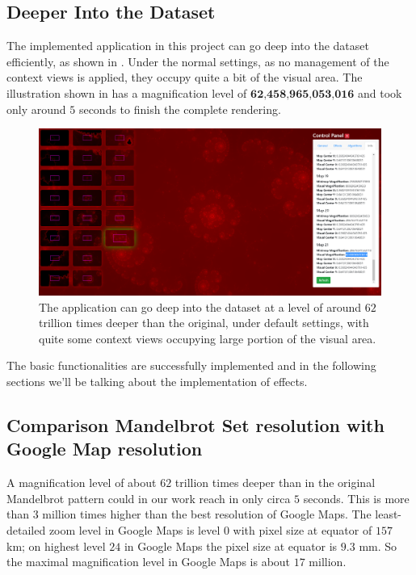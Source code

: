 \subsection{Deeper Into the Dataset}

The implemented application in this project can go deep into the dataset efficiently, as shown in . Under the normal settings, as no management of the context views is applied, they occupy quite a bit of the visual area. The illustration shown in  has a magnification level of $\textbf{62,458,965,053,016}$ and took only around $5$ seconds to finish the complete rendering.

\begin{figure}[H]
\centering
\includegraphics[width=\textwidth,keepaspectratio]{Figures/Chapter5/deep.png}
\decoRule
\caption[Zooming Deep Into the Dataset]{The application can go deep into the dataset at a level of around $62$ trillion times deeper than the original, under default settings, with quite some context views occupying large portion of the visual area.}
\label{fig:chap5:deep}
\end{figure}

The basic functionalities are successfully implemented and in the following sections we'll be talking about the implementation of effects.

\subsection{Comparison Mandelbrot Set resolution with Google Map resolution}

A magnification level of about $62$ trillion times deeper than in the original Mandelbrot pattern could in our work reach in only circa $5$ seconds. This is more than $3$ million times higher than the best resolution of Google Maps. The least-detailed zoom level in Google Maps is level $0$ with pixel size at equator of $157$ km; on highest level $24$ in Google Maps the pixel size at equator is $9.3$ mm\cite{microimages2012googlemaps}. So the maximal magnification level in Google Maps is about $17$ million.

